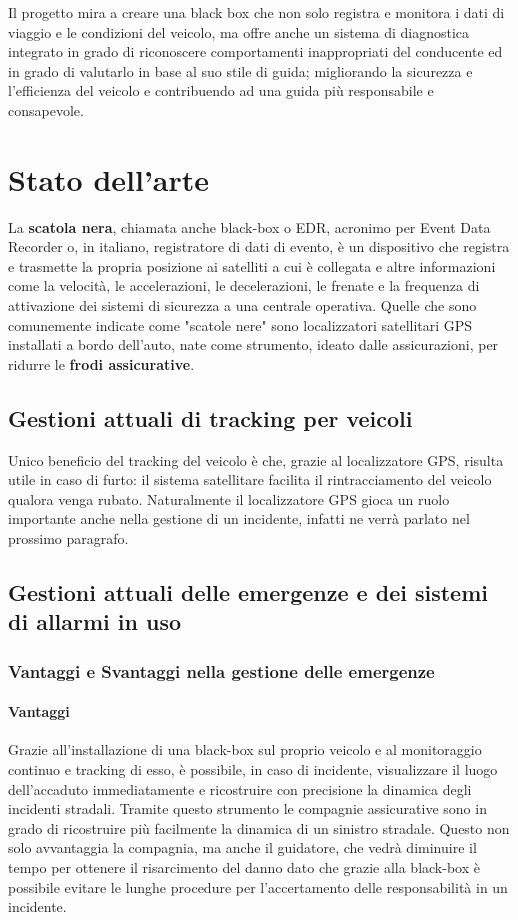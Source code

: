 \documentclass[12pt, a4paper, italian]{report}
\numberwithin{figure}{chapter}
\numberwithin{table}{chapter}
\begin{document}
\vspace{1cm}

Il progetto mira a creare una black box che non solo registra e monitora i dati di viaggio e le condizioni del veicolo, ma offre anche un sistema di diagnostica integrato in grado di riconoscere comportamenti inappropriati del conducente ed in grado di valutarlo in base al suo stile di guida; migliorando la sicurezza e l’efficienza del veicolo e contribuendo ad una guida più responsabile e consapevole.

\chapter{Stato dell'arte}
La \textbf{scatola nera}, chiamata anche black-box o EDR, acronimo per Event Data Recorder o, in italiano, registratore di dati di evento, è un dispositivo che registra e trasmette la propria posizione ai satelliti a cui è collegata e altre informazioni come la velocità, le accelerazioni, le decelerazioni, le frenate e la frequenza di attivazione dei sistemi di sicurezza a una centrale operativa.
Quelle che sono comunemente indicate come "scatole nere" sono localizzatori satellitari GPS installati a bordo dell'auto, nate come strumento, ideato dalle assicurazioni, per ridurre le \textbf{frodi assicurative}.
\section{Gestioni attuali di tracking per veicoli}
Unico beneficio del tracking del veicolo è che, grazie al localizzatore GPS, risulta utile in caso di furto: il sistema satellitare facilita il rintracciamento del veicolo qualora venga rubato. Naturalmente il localizzatore GPS gioca un ruolo importante anche nella gestione di un incidente, infatti ne verrà parlato nel prossimo paragrafo.
\section{Gestioni attuali delle emergenze e dei sistemi di allarmi in uso}
\subsection{Vantaggi e Svantaggi nella gestione delle emergenze}
\subsubsection{Vantaggi}
Grazie all'installazione di una black-box sul proprio veicolo e al monitoraggio continuo e tracking di esso, è possibile, in caso di incidente, visualizzare il luogo dell'accaduto immediatamente e ricostruire con precisione la dinamica degli incidenti stradali. Tramite questo strumento le compagnie assicurative sono in grado di ricostruire più facilmente la dinamica di un sinistro stradale. Questo non solo avvantaggia la compagnia, ma anche il guidatore, che vedrà diminuire il tempo per ottenere il risarcimento del danno dato che grazie alla black-box è possibile evitare le lunghe procedure per l'accertamento delle responsabilità in un incidente.
\end{document}
